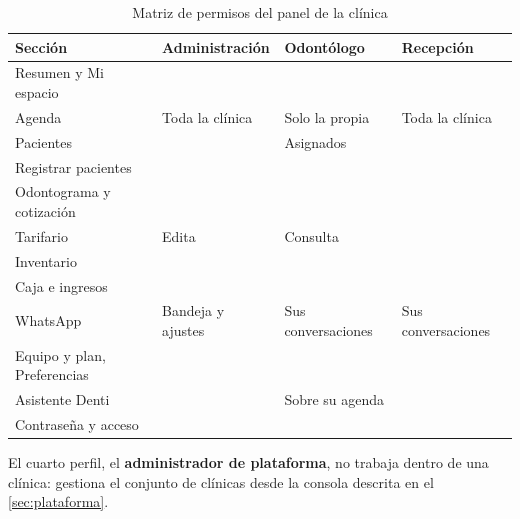 \documentclass[11pt]{article}
\begin{document}
\begin{table}[H]
\centering\small
\caption{Matriz de permisos del panel de la clínica}\label{tab:matriz}
\begin{tabularx}{\linewidth}{@{}L C{2.6cm} C{2.6cm} C{2.6cm}@{}}
\toprule
\textbf{Sección} & \textbf{Administración} & \textbf{Odontólogo} & \textbf{Recepción} \\
\midrule
Resumen y Mi espacio      &  &  &  \\
Agenda                    & Toda la clínica & Solo la propia & Toda la clínica \\
Pacientes                 &  & Asignados &  \\
Registrar pacientes       &  & \textcolor{sdmuted}{} &  \\
Odontograma y cotización  &  &  & \textcolor{sdmuted}{} \\
Tarifario                 & Edita & Consulta & \textcolor{sdmuted}{} \\
Inventario                &  & \textcolor{sdmuted}{} &  \\
Caja e ingresos           &  & \textcolor{sdmuted}{} & \textcolor{sdmuted}{} \\
WhatsApp                  & Bandeja y ajustes & Sus conversaciones & Sus conversaciones \\
Equipo y plan, Preferencias &  & \textcolor{sdmuted}{} & \textcolor{sdmuted}{} \\
Asistente Denti           &  & Sobre su agenda &  \\
Contraseña y acceso       &  &  &  \\
\bottomrule
\end{tabularx}
\end{table}

El cuarto perfil, el \textbf{administrador de plataforma}, no trabaja dentro de una clínica: gestiona el conjunto de clínicas desde la consola descrita en el \cref{sec:plataforma}.

\label{sec:primeros}
\end{document}
